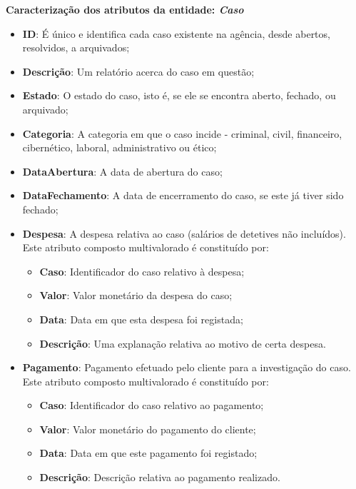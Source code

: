 \documentclass[a4paper,12pt]{scrreprt}
\begin{document}
        \textbf{Caracterização dos atributos da entidade: \textit{Caso}}
        \begin{itemize}
            \item \textbf{ID}: É único e identifica cada caso existente na agência, desde abertos, resolvidos, a arquivados;
            \item \textbf{Descrição}: Um relatório acerca do caso em questão; 
            \item \textbf{Estado}: O estado do caso, isto é, se ele se encontra aberto, fechado, ou arquivado; 
            \item \textbf{Categoria}: A categoria em que o caso incide - criminal, civil, financeiro, cibernético, laboral, administrativo ou ético;
            \item \textbf{DataAbertura}: A data de abertura do caso; 
            \item \textbf{DataFechamento}: A data de encerramento do caso, se este já tiver sido fechado;

        \clearpage
            
            \item \textbf{Despesa}: A despesa relativa ao caso (salários de detetives não incluídos). Este atributo composto multivalorado é constituído por: 
            \begin{itemize}
                \item \textbf{Caso}: Identificador do caso relativo à despesa;
                \item \textbf{Valor}: Valor monetário da despesa do caso;
                \item \textbf{Data}: Data em que esta despesa foi registada;
                \item \textbf{Descrição}: Uma explanação relativa ao motivo de certa despesa.
            \end{itemize}
            \item \textbf{Pagamento}: Pagamento efetuado pelo cliente para a investigação do caso. Este atributo composto multivalorado é constituído por: 
            \begin{itemize}
                \item \textbf{Caso}: Identificador do caso relativo ao pagamento;
                \item \textbf{Valor}: Valor monetário do pagamento do cliente;
                \item \textbf{Data}: Data em que este pagamento foi registado;
                \item \textbf{Descrição}: Descrição relativa ao pagamento realizado.
            \end{itemize}
        \end{itemize}
\end{document}
